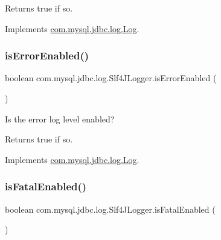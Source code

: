 \begin{DoxyReturn}{Returns}
true if so. 
\end{DoxyReturn}


Implements \mbox{\hyperlink{interfacecom_1_1mysql_1_1jdbc_1_1log_1_1_log_a2e59f38e2359e90879c658cfb2f4e518}{com.\+mysql.\+jdbc.\+log.\+Log}}.

\mbox{\label{classcom_1_1mysql_1_1jdbc_1_1log_1_1_slf4_j_logger_aeadc840396cd428c64ca320c2a0c9e5c}} 
\subsubsection{\texorpdfstring{is\+Error\+Enabled()}{isErrorEnabled()}}
{\footnotesize\ttfamily boolean com.\+mysql.\+jdbc.\+log.\+Slf4\+J\+Logger.\+is\+Error\+Enabled (\begin{DoxyParamCaption}{ }\end{DoxyParamCaption})}

Is the \textquotesingle{}error\textquotesingle{} log level enabled?

\begin{DoxyReturn}{Returns}
true if so. 
\end{DoxyReturn}


Implements \mbox{\hyperlink{interfacecom_1_1mysql_1_1jdbc_1_1log_1_1_log_aece1d483e86ea84bd1553ed993c56c59}{com.\+mysql.\+jdbc.\+log.\+Log}}.

\mbox{\label{classcom_1_1mysql_1_1jdbc_1_1log_1_1_slf4_j_logger_a63e7f859d44fddeb866c6198900af811}} 
\subsubsection{\texorpdfstring{is\+Fatal\+Enabled()}{isFatalEnabled()}}
{\footnotesize\ttfamily boolean com.\+mysql.\+jdbc.\+log.\+Slf4\+J\+Logger.\+is\+Fatal\+Enabled (\begin{DoxyParamCaption}{ }\end{DoxyParamCaption})}

